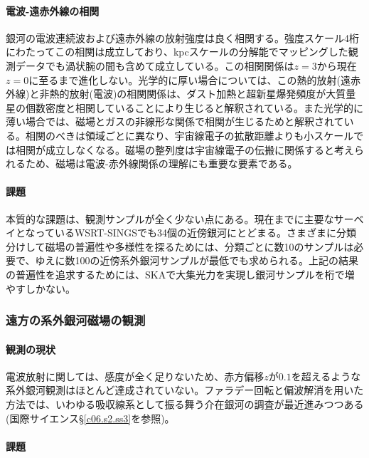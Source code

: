 \paragraph{電波-遠赤外線の相関}

銀河の電波連続波および遠赤外線の放射強度は良く相関する\citep{2003ApJ...586..794B}。強度スケール4桁にわたってこの相関は成立しており、kpcスケールの分解能でマッピングした観測データでも渦状腕の間も含めて成立している\citep{2011AJ....141...41D}。この相関関係は$z=3$から現在$z=0$に至るまで進化しない\citep{2008ApJ...678..828M}。光学的に厚い場合については、この熱的放射(遠赤外線)と非熱的放射(電波)の相関関係は、ダスト加熱と超新星爆発頻度が大質量星の個数密度と相関していることにより生じると解釈されている。また光学的に薄い場合では、磁場とガスの非線形な関係で相関が生じるためと解釈されている。相関のべきは領域ごとに異なり、宇宙線電子の拡散距離よりも小スケールでは相関が成立しなくなる。磁場の整列度は宇宙線電子の伝搬に関係すると考えられるため、磁場は電波-赤外線関係の理解にも重要な要素である。

\paragraph{課題}

本質的な課題は、観測サンプルが全く少ない点にある。現在までに主要なサーベイとなっているWSRT-SINGS\citep{2007A&A...461..455B,2009A&A...503..409H,2010A&A...514A..42B}でも34個の近傍銀河にとどまる。さまざまに分類分けして磁場の普遍性や多様性を探るためには、分類ごとに数10のサンプルは必要で、ゆえに数100の近傍系外銀河サンプルが最低でも求められる。上記の結果の普遍性を追求するためには、SKAで大集光力を実現し銀河サンプルを桁で増やすしかない。


\subsubsection{遠方の系外銀河磁場の観測}
\label{c06.s1.ss3.sss4}

\paragraph{観測の現状}

電波放射に関しては、感度が全く足りないため、赤方偏移$z$が$0.1$を超えるような系外銀河観測はほとんど達成されていない。ファラデー回転と偏波解消を用いた方法では、いわゆる吸収線系として振る舞う介在銀河の調査が最近進みつつある(国際サイエンス\S \ref{c06.s2.ss3}を参照)。

\paragraph{課題}

